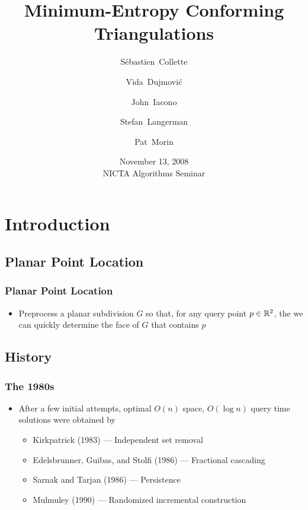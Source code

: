 \documentclass{beamer}
\title{Minimum-Entropy Conforming Triangulations}
\author{S\'ebastien~Collette 
	\and Vida~Dujmovi\'c 
	\and John~Iacono
	\and Stefan~Langerman
	\and Pat~Morin}
\date{November 13, 2008 \\ NICTA Algorithms Seminar}
\begin{document}
\frame{\titlepage}


\section{Introduction}
\subsection{Planar Point Location}
\frame
{
  \frametitle{Planar Point Location}
  \begin{itemize}
  \item Preprocess a planar subdivision $G$ so that, for any query
point $p\in\mathbb{R}^2$, the we can quickly determine the face of $G$
that contains $p$
  \begin{center}
  \end{center}
  \end{itemize}
}

\subsection{History}

\frame
{
  \frametitle{The 1980s}
  \begin{itemize}
  \item<1-> After a few initial attempts, optimal $O(n)$ space, $O(\log
n)$ query time solutions were obtained by
  \begin{itemize}
   \item<2-> Kirkpatrick (1983) --- Independent set removal
   \item<3-> Edelsbrunner, Guibas, and Stolfi (1986) --- Fractional cascading
   \item<4-> Sarnak and Tarjan (1986) --- Persistence
   \item<5-> Mulmuley (1990) --- Randomized incremental construction
  \end{itemize}
  \end{itemize}
}
\end{document}
